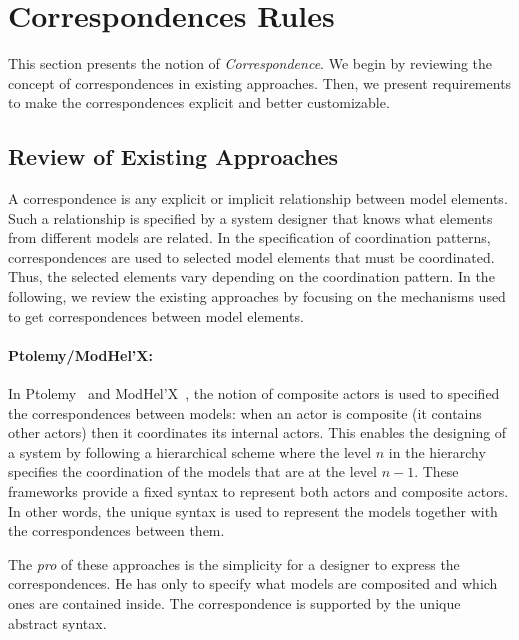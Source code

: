 \section{Correspondences Rules}


This section presents the notion of \emph{Correspondence}. We begin by reviewing the concept of correspondences in existing approaches. Then, we present requirements to make the correspondences explicit and better customizable.  

\subsection{Review of Existing Approaches}
A correspondence is any explicit or implicit relationship between model elements. Such a relationship is specified by a system designer that knows what elements from different models are related. In the specification of coordination patterns, correspondences are used to selected model elements that must be coordinated. Thus, the selected elements vary depending on the coordination pattern. In the following, we review the existing approaches by focusing on the mechanisms used to get correspondences between model elements.      

\paragraph{Ptolemy/ModHel'X: }
In Ptolemy~\cite{ptoleframebib} and ModHel'X~\cite{modhelxbib}, the notion of composite actors is used to specified the correspondences between models: when an actor is composite (\ie it contains other actors) then it coordinates its internal actors. This enables the designing of a system by following a hierarchical scheme where the level $n$ in the hierarchy specifies the coordination of the models that are at the level $n-1$. These frameworks provide a fixed syntax to represent both actors and composite actors. In other words, the unique syntax is used to represent the models together with the correspondences between them. 

The \emph{pro} of these approaches is the simplicity for a designer to express the correspondences. He has only to specify what models are composited and which ones are contained inside. The correspondence is supported by the unique abstract syntax. 

